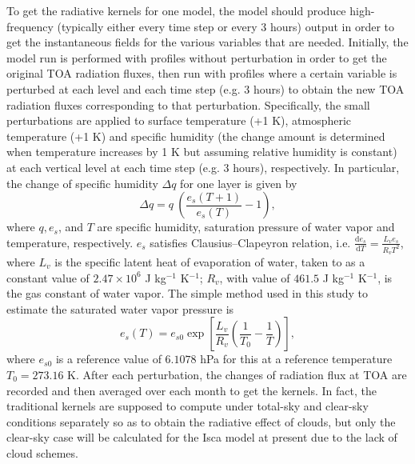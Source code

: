 To get the radiative kernels for one model, the model should produce high-frequency (typically either every time step or every 3 hours) output in order to get the instantaneous fields for the various variables that are needed. Initially, the model run is performed with profiles without perturbation in order to get the original TOA radiation fluxes, then run with profiles where a certain variable is perturbed at each level and each time step (e.g. 3 hours) to obtain the new TOA radiation fluxes corresponding to that perturbation. Specifically, the small perturbations are applied to surface temperature (+1 K), atmospheric temperature (+1 K) and specific humidity (the change amount is determined when temperature increases by 1 K but assuming relative humidity is constant) at each vertical level at each time step (e.g. 3 hours), respectively. In particular, the change of specific humidity $\Delta q$ for one layer is given by
\begin{equation}
\Delta q = q~\left(\frac{e_s(T+1)}{e_s(T)}-1\right),
\end{equation}
where $q, e_s$, and $T$ are specific humidity, saturation pressure of water vapor and temperature, respectively. $e_s$ satisfies Clausius–Clapeyron relation, i.e. $\frac {\mathrm{d} e_s} {\mathrm{d} T} = \frac{L_v e_s}{R_v T^2}$,
where $L_v$ is the specific latent heat of evaporation of water, taken to as a constant value of $2.47\times 10^6$ J kg$^{-1}$ K$^{-1}$; $R_v$, with value of $461.5$ J kg$^{-1}$ K$^{-1}$, is the gas constant of water vapor. The simple method used in this study to estimate the saturated water vapor pressure is 
\begin{equation}
e_s(T) = e_{s0}\exp\left[\frac{L_v}{R_v}\left(\frac{1}{T_0}-\frac{1}{T} \right)\right],
\end{equation}
where $e_{s0}$ is a reference value of $6.1078$ hPa for this at a reference temperature $T_0=273.16$ K. After each perturbation, the changes of radiation flux at TOA are recorded and then averaged over each month to get the kernels. In fact, the traditional kernels are supposed to compute under total-sky and clear-sky conditions separately so as to obtain the radiative effect of clouds, but only the clear-sky case will be calculated for the Isca model at present due to the lack of cloud schemes.

